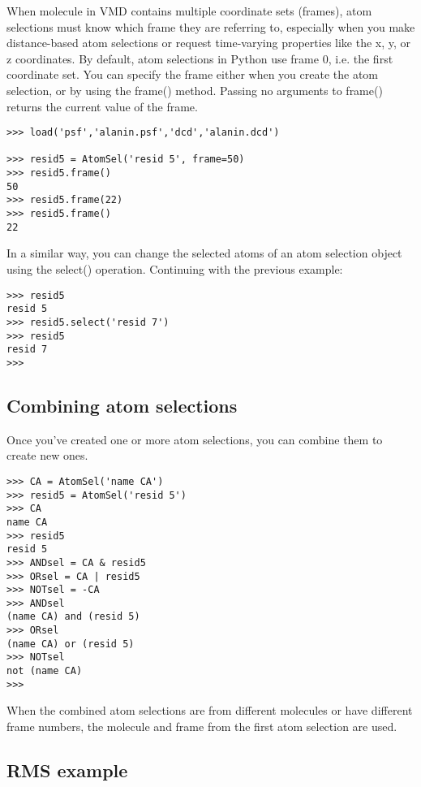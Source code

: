 When molecule in VMD contains multiple coordinate sets (frames), atom 
selections must know which frame they are referring to, especially when
you make distance-based atom selections or request time-varying properties
like the x, y, or z coordinates.  By default, atom selections in Python 
use frame 0, i.e. the first coordinate set.  You can specify the frame 
either when you create the atom selection, or by using the frame() method.
Passing no arguments to frame() returns the current value of the frame.

\begin{verbatim}
>>> load('psf','alanin.psf','dcd','alanin.dcd')

>>> resid5 = AtomSel('resid 5', frame=50)
>>> resid5.frame()
50
>>> resid5.frame(22)
>>> resid5.frame()
22
\end{verbatim}

In a similar way, you can change the selected atoms of an atom selection object
using the select() operation.  Continuing with the previous example:

\begin{verbatim}
>>> resid5
resid 5
>>> resid5.select('resid 7')
>>> resid5
resid 7
>>>
\end{verbatim}

\subsection{Combining atom selections}

Once you've created one or more atom selections, you can combine them to
create new ones.  

\begin{verbatim}
>>> CA = AtomSel('name CA')
>>> resid5 = AtomSel('resid 5')
>>> CA
name CA
>>> resid5
resid 5
>>> ANDsel = CA & resid5
>>> ORsel = CA | resid5
>>> NOTsel = -CA
>>> ANDsel
(name CA) and (resid 5)
>>> ORsel
(name CA) or (resid 5)
>>> NOTsel
not (name CA)
>>> 
\end{verbatim}

When the combined atom selections are from different
molecules or have different frame numbers, the molecule and frame from the
first atom selection are used.

\subsection{RMS example}

